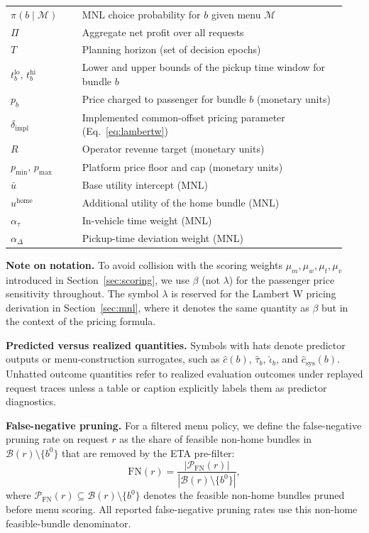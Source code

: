 \begin{table}[t]
\begin{tabular}{@{}p{0.20\linewidth}p{0.74\linewidth}@{}}
$\pi(b \mid \mathcal{M})$ & MNL choice probability for $b$ given menu $\mathcal{M}$ \\
$\Pi$ & Aggregate net profit over all requests \\
$T$ & Planning horizon (set of decision epochs) \\
$t_b^{\text{lo}},\, t_b^{\text{hi}}$ & Lower and upper bounds of the pickup time window for bundle $b$ \\
$p_b$ & Price charged to passenger for bundle $b$ (monetary units) \\
$\delta_{\text{impl}}$ & Implemented common-offset pricing parameter (Eq.~\ref{eq:lambertw}) \\
$R$ & Operator revenue target (monetary units) \\
$p_{\min},\, p_{\max}$ & Platform price floor and cap (monetary units) \\
$\bar{u}$ & Base utility intercept (MNL) \\
$u^{\text{home}}$ & Additional utility of the home bundle (MNL) \\
$\alpha_\tau$ & In-vehicle time weight (MNL) \\
$\alpha_\Delta$ & Pickup-time deviation weight (MNL) \\
\hline
\end{tabular}
\end{table}

\noindent\textbf{Note on notation.} To avoid collision with the scoring weights $\mu_m, \mu_w, \mu_t, \mu_v$ introduced in Section~\ref{sec:scoring}, we use $\beta$ (not $\lambda$) for the passenger price sensitivity throughout. The symbol $\lambda$ is reserved for the Lambert W pricing derivation in Section~\ref{sec:mnl}, where it denotes the same quantity as $\beta$ but in the context of the pricing formula.

\noindent\textbf{Predicted versus realized quantities.} Symbols with hats denote predictor outputs or menu-construction surrogates, such as $\hat{c}(b)$, $\hat{\tau}_b$, $\hat{\iota}_b$, and $\hat{c}_{\text{sys}}(b)$. Unhatted outcome quantities refer to realized evaluation outcomes under replayed request traces unless a table or caption explicitly labels them as predictor diagnostics.

\noindent\textbf{False-negative pruning.} For a filtered menu policy, we define the false-negative pruning rate on request $r$ as the share of feasible non-home bundles in $\mathcal{B}(r) \setminus \{b^0\}$ that are removed by the ETA pre-filter:
\[
  \mathrm{FN}(r) = \frac{|\mathcal{P}_{\mathrm{FN}}(r)|}{|\mathcal{B}(r) \setminus \{b^0\}|},
\]
where $\mathcal{P}_{\mathrm{FN}}(r) \subseteq \mathcal{B}(r) \setminus \{b^0\}$ denotes the feasible non-home bundles pruned before menu scoring. All reported false-negative pruning rates use this non-home feasible-bundle denominator.


